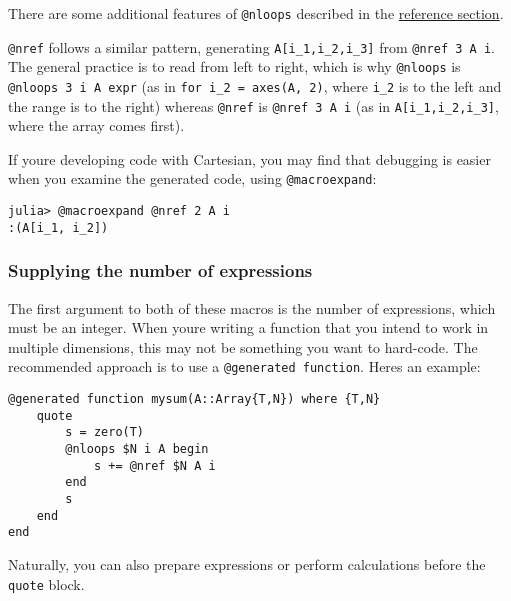 There are some additional features of \texttt{@nloops} described in the \hyperlink{6401299442402093832}{reference section}.



\texttt{@nref} follows a similar pattern, generating \texttt{A[i\_1,i\_2,i\_3]} from \texttt{@nref 3 A i}. The general practice is to read from left to right, which is why \texttt{@nloops} is \texttt{@nloops 3 i A expr} (as in \texttt{for i\_2 = axes(A, 2)}, where \texttt{i\_2} is to the left and the range is to the right) whereas \texttt{@nref} is \texttt{@nref 3 A i} (as in \texttt{A[i\_1,i\_2,i\_3]}, where the array comes first).



If you{\textquotesingle}re developing code with Cartesian, you may find that debugging is easier when you examine the generated code, using \texttt{@macroexpand}:






\begin{verbatim}
julia> @macroexpand @nref 2 A i
:(A[i_1, i_2])
\end{verbatim}





\hypertarget{13048573846185312344}{}


\subsubsection{Supplying the number of expressions}



The first argument to both of these macros is the number of expressions, which must be an integer. When you{\textquotesingle}re writing a function that you intend to work in multiple dimensions, this may not be something you want to hard-code. The recommended approach is to use a \texttt{@generated function}.  Here{\textquotesingle}s an example:




\begin{verbatim}
@generated function mysum(A::Array{T,N}) where {T,N}
    quote
        s = zero(T)
        @nloops $N i A begin
            s += @nref $N A i
        end
        s
    end
end
\end{verbatim}



Naturally, you can also prepare expressions or perform calculations before the \texttt{quote} block.



